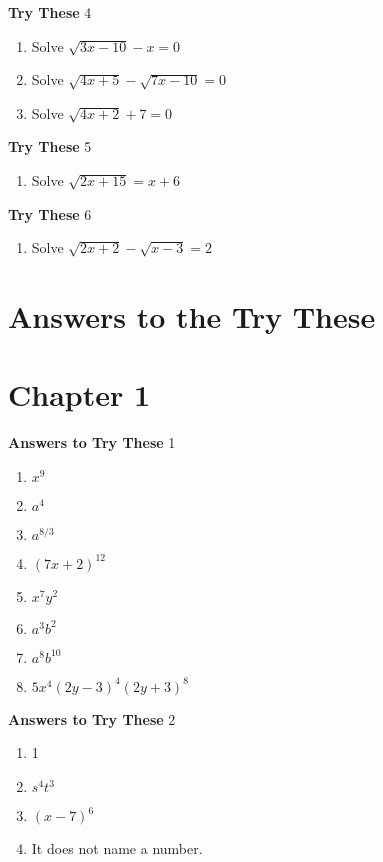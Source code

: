 \documentclass[a4paper]{JAC2003}
\begin{document}
\noindent\textcolor{red!75!black}{\textbf{Try These}} 4
\begin{enumerate}
\item Solve $\sqrt{3 x-10}-x=0$

\item Solve $\sqrt{4 x+5}-\sqrt{7 x-10}=0$

\item Solve $\sqrt{4 x+2}+7=0$
\end{enumerate}

\noindent\textcolor{red!75!black}{\textbf{Try These}} 5
\begin{enumerate}
\item Solve $\sqrt{2 x+15}=x+6$
\end{enumerate}

\noindent\textcolor{red!75!black}{\textbf{Try These}} 6
\begin{enumerate}
\item Solve $\sqrt{2 x+2}-\sqrt{x-3}=2$
\end{enumerate}

\clearpage
\section{Answers to the Try These}

\section{Chapter 1}
\noindent\textcolor{red!75!black}{\textbf{Answers to Try These}} 1
\begin{enumerate}
\item $x^{9}$

\item $a^{4}$

\item $a^{8/3}$

\item $(7x+2)^{12}$

\item $x^{7}y^{2}$

\item $a^{3}b^{2}$

\item $a^{8}b^{10}$

\item $5x^{4}(2y-3)^{4}(2y+3)^{8}$
\end{enumerate}

\noindent\textcolor{red!75!black}{\textbf{Answers to Try These}} 2 
\begin{enumerate}
\item 1

\item $s^{4} t^{3}$

\item $(x-7)^{6}$

\item It does not name a number.
\end{enumerate}
\end{document}
